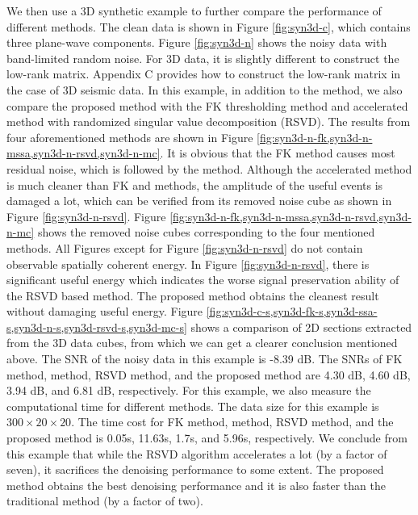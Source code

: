 We then use a 3D synthetic example to further compare the performance of different methods. The clean data is shown in Figure \ref{fig:syn3d-c}, which contains three plane-wave components. Figure \ref{fig:syn3d-n} shows the noisy data with band-limited random noise. For 3D data, it is slightly different to construct the low-rank matrix. Appendix C provides how to construct the low-rank matrix in the case of 3D seismic data. In this example, in addition to the  method, we also compare the proposed method with the FK thresholding method and accelerated  method with randomized singular value decomposition (RSVD). The results from four aforementioned methods are shown in Figure \ref{fig:syn3d-n-fk,syn3d-n-mssa,syn3d-n-rsvd,syn3d-n-mc}. It is obvious that the FK method causes most residual noise, which is followed by the  method. Although the accelerated  method is much cleaner than FK and  methods, the amplitude of the useful events is damaged a lot, which can be verified from its removed noise cube as shown in Figure \ref{fig:syn3d-n-rsvd}. Figure \ref{fig:syn3d-n-fk,syn3d-n-mssa,syn3d-n-rsvd,syn3d-n-mc} shows the removed noise cubes corresponding to the four mentioned methods. All Figures except for Figure \ref{fig:syn3d-n-rsvd} do not contain observable spatially coherent energy. In Figure \ref{fig:syn3d-n-rsvd}, there is significant useful energy which indicates the worse signal preservation ability of the RSVD based  method. The proposed method obtains the cleanest result without damaging useful energy. Figure \ref{fig:syn3d-c-s,syn3d-fk-s,syn3d-ssa-s,syn3d-n-s,syn3d-rsvd-s,syn3d-mc-s} shows a comparison of 2D sections extracted from the 3D data cubes, from which we can get a clearer conclusion mentioned above. The SNR of the noisy data in this example is -8.39 dB. The SNRs of FK method,  method, RSVD method, and the proposed method are 4.30 dB, 4.60 dB, 3.94 dB, and 6.81 dB, respectively. For this example, we also measure the computational time for different methods. The data size for this example is $300\times 20\times 20$. The time cost for FK method,  method, RSVD method, and the proposed method is 0.05s, 11.63s, 1.7s, and 5.96s, respectively. We conclude from this example that while the RSVD algorithm accelerates  a lot (by a factor of seven), it sacrifices the denoising performance to some extent. The proposed method obtains the best denoising performance and it is also faster than the traditional  method (by a factor of two). 

